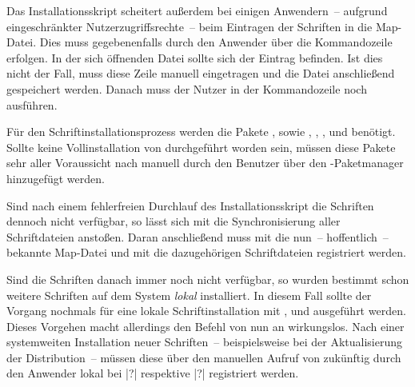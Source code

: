 Das Installationsskript scheitert außerdem bei einigen Anwendern~-- aufgrund 
eingeschränkter Nutzerzugriffsrechte~-- beim Eintragen der Schriften in die 
Map-Datei. Dies muss gegebenenfalls durch den Anwender über die Kommandozeile 
 erfolgen. In der sich öffnenden 
Datei sollte sich der Eintrag  befinden. Ist dies nicht 
der Fall, muss diese Zeile manuell eingetragen und die Datei anschließend 
gespeichert werden. Danach muss der Nutzer in der Kommandozeile noch 
 ausführen.


Für den Schriftinstallationsprozess werden die Pakete , 
 sowie , , 
,  und  benötigt. Sollte 
keine Vollinstallation von  durchgeführt worden 
sein, müssen diese Pakete sehr aller Voraussicht nach manuell durch den 
Benutzer über den -Paketmanager hinzugefügt 
werden.

Sind nach einem fehlerfreien Durchlauf des Installationsskript die Schriften 
dennoch nicht verfügbar, so lässt sich mit  
die Synchronisierung aller Schriftdateien anstoßen. Daran anschließend muss mit 
 die nun~-- hoffentlich~-- bekannte 
Map-Datei und mit  die dazugehörigen Schriftdateien 
registriert werden.

Sind die Schriften danach immer noch nicht verfügbar, so wurden bestimmt schon 
weitere Schriften auf dem System \emph{lokal} installiert. In diesem Fall 
sollte der Vorgang nochmals für eine lokale Schriftinstallation mit 
,  und 
 ausgeführt werden. Dieses Vorgehen macht allerdings den 
Befehl  von nun an wirkungslos. Nach einer systemweiten 
Installation neuer Schriften~-- beispielsweise bei der Aktualisierung der 
Distribution~-- müssen diese über den manuellen Aufruf von  
zukünftig durch den Anwender lokal bei |?| 
respektive |?| registriert werden.




